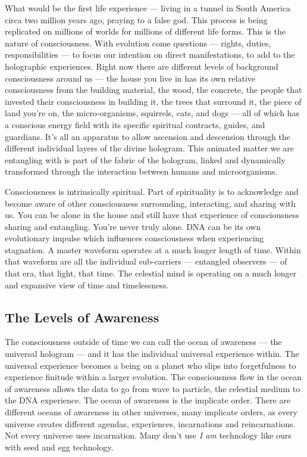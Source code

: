 What would be the first life experience --- living in a tunnel in South
America circa two million years ago, praying to a false god. This
process is being replicated on millions of worlds for millions of
different life forms. This is the nature of consciousness. With
evolution come questions --- rights, duties, responsibilities --- to
focus our intention on direct manifestations, to add to the holographic
experiences. Right now there are different levels of background
consciousness around us --- the house you live in has its own relative
consciousness from the building material, the wood, the concrete, the
people that invested their consciousness in building it, the trees that
surround it, the piece of land you're on, the micro-organisms,
squirrels, cats, and dogs --- all of which has a conscious energy field
with its specific spiritual contracts, guides, and guardians. It's all
an apparatus to allow ascension and descension through the different
individual layers of the divine hologram. This animated matter we are
entangling with is part of the fabric of the hologram, linked and
dynamically transformed through the interaction between humans and
microorganisms.

Consciousness is intrinsically spiritual. Part of spirituality is to
acknowledge and become aware of other consciousness surrounding,
interacting, and sharing with us. You can be alone in the house and
still have that experience of consciousness sharing and entangling.
You're never truly alone. DNA can be its own evolutionary impulse which
influences consciousness when experiencing stagnation. A master waveform
operates at a much longer length of time. Within that waveform are all
the individual sub-carriers --- entangled observers --- of that era,
that light, that time. The celestial mind is operating on a much longer
and expansive view of time and timelessness.

\subsection*{The Levels of Awareness}\label{the-levels-of-awareness}

The consciousness outside of time we can call the ocean of awareness ---
the universal hologram --- and it has the individual universal
experience within. The universal experience becomes a being on a planet
who slips into forgetfulness to experience finitude within a larger
evolution. The consciousness flow in the ocean of awareness allows the
data to go from wave to particle, the celestial medium to the DNA
experience. The ocean of awareness is the implicate order. There are
different oceans of awareness in other universes, many implicate orders,
as every universe creates different agendas, experiences, incarnations
and reincarnations. Not every universe uses incarnation. Many don't use
\emph{I am} technology like ours with seed and egg technology.

